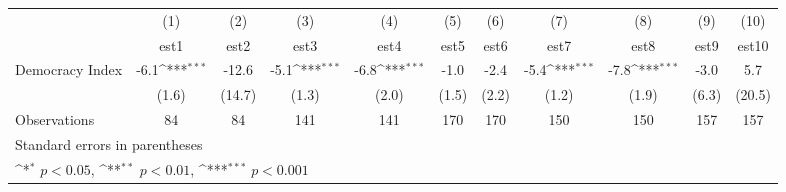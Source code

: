 {
\def\sym#1{\ifmmode^{#1}\else\(^{#1}\)\fi}
\begin{tabular}{l*{10}{c}}
\hline\hline
                    &\multicolumn{1}{c}{(1)}         &\multicolumn{1}{c}{(2)}         &\multicolumn{1}{c}{(3)}         &\multicolumn{1}{c}{(4)}         &\multicolumn{1}{c}{(5)}         &\multicolumn{1}{c}{(6)}         &\multicolumn{1}{c}{(7)}         &\multicolumn{1}{c}{(8)}         &\multicolumn{1}{c}{(9)}         &\multicolumn{1}{c}{(10)}         \\
                    &        est1         &        est2         &        est3         &        est4         &        est5         &        est6         &        est7         &        est8         &        est9         &       est10         \\
\hline
Democracy Index     &        -6.1\sym{***}&       -12.6         &        -5.1\sym{***}&        -6.8\sym{***}&        -1.0         &        -2.4         &        -5.4\sym{***}&        -7.8\sym{***}&        -3.0         &         5.7         \\
                    &       (1.6)         &      (14.7)         &       (1.3)         &       (2.0)         &       (1.5)         &       (2.2)         &       (1.2)         &       (1.9)         &       (6.3)         &      (20.5)         \\
\hline
Observations        &          84         &          84         &         141         &         141         &         170         &         170         &         150         &         150         &         157         &         157         \\
\hline\hline
\multicolumn{11}{l}{\footnotesize Standard errors in parentheses}\\
\multicolumn{11}{l}{\footnotesize \sym{*} \(p<0.05\), \sym{**} \(p<0.01\), \sym{***} \(p<0.001\)}\\
\end{tabular}
}
